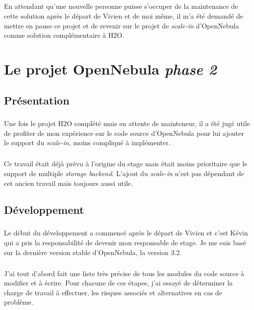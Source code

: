 \paragraph*{}
En attendant qu'une nouvelle personne puisse s'occuper de la maintenance de cette solution après le départ de Vivien et de moi même, il m'a été demandé de mettre en pause ce projet
et de revenir sur le projet de \emph{scale-in} d'OpenNebula comme solution complémentaire à H2O.


\chapter{Le projet OpenNebula \emph{phase 2}}

\section{Présentation}
\paragraph*{}
Une fois le projet H2O complété mais en attente de mainteneur, il a été jugé utile de profiter de mon expérience sur le code source d'OpenNebula pour lui ajouter
le support du \emph{scale-in}, moins compliqué à implémenter.

\paragraph*{}
Ce travail était déjà prévu à l'origine du stage mais était moins prioritaire que le support de multiple \emph{storage backend}.
L'ajout du \emph{scale-in} n'est pas dépendant de cet ancien travail mais toujours aussi utile.\\

\section{Développement}
\paragraph*{}
Le début du développement a commencé après le départ de Vivien et c'est Kévin qui a pris la responsabilité de devenir mon responsable de stage.
Je me suis basé sur la dernière version stable d'OpenNebula, la version 3.2.

\paragraph*{}
J'ai tout d'abord fait une liste très précise de tous les modules du code source à modifier et à écrire. Pour chacune de ces étapes, j'ai essayé de déterminer
la charge de travail à effectuer, les risques associés et alternatives en cas de problème.

